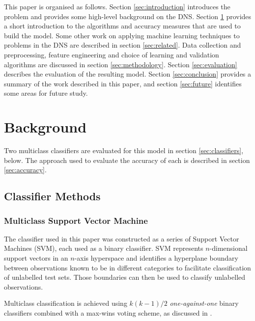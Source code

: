 \documentclass[conference]{IEEEtran}
\let\citep\cite
\begin{document}
This paper is organised as follows. Section \ref{sec:introduction}
introduces the problem and provides some high-level background on the
DNS. Section \ref{sec:background} provides a short introduction to the
algorithms and accuracy measures that are used to build the model. Some
other work on applying machine learning techniques to problems in the
DNS are described in section \ref{sec:related}. Data collection and
preprocessing, feature engineering and choice of learning and validation
algorithms are discussed in section \ref{sec:methodology}. Section
\ref{sec:evaluation} describes the evaluation of the resulting model.
Section \ref{sec:conclusion} provides a summary of the work described in
this paper, and section \ref{sec:future} identifies some areas for
future study.

\section{Background}\label{sec:background}

\label{sec:background}

Two multiclass classifiers are evaluated for this model in section
\ref{sec:classifiers}, below. The approach used to evaluate the accuracy
of each is described in section \ref{sec:accuracy}.

\subsection{Classifier Methods}\label{sec:classifier-methods}

\label{sec:classifiers}

\subsubsection{Multiclass Support Vector
Machine}\label{sec:multiclass-support-vector-machine}

The classifier used in this paper was constructed as a series of Support
Vector Machines (SVM), each used as a binary classifier. SVM represents
\(n\)-dimensional support vectors in an \(n\)-axis hyperspace and
identifies a hyperplane boundary between observations known to be in
different categories to facilitate classification of unlabelled test
sets. Those boundaries can then be used to classify unlabelled
observations.

Multiclass classification is achieved using \(k(k-1)/2\)
\emph{one-against-one} binary classifiers combined with a max-wins
voting scheme, as discussed in \citep{10.1007/11494683_28}.
\end{document}
